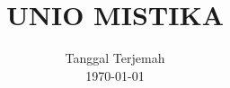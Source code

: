 


%




\title{UNIO MISTIKA}
\date{Tanggal Terjemah\\
      \today}
\maketitle\thispagestyle{empty}
\pagestyle{empty}
\tableofcontents
\fancychapterstyle

\pagestyle{mystyle}
\setcounter{page}{1}
\ifdefined\theHchapter\else\newcommand\theHchapter{\arabic{chapter}}\fi
